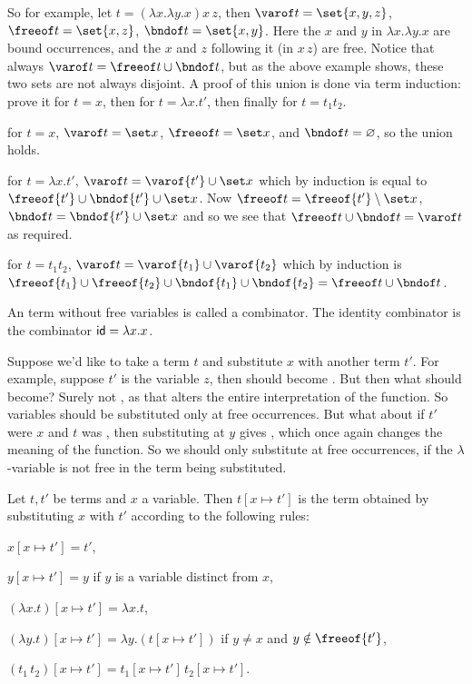 \edefn

So for example, let $t=(\lambda x.\lambda y.x)x\,z$, then $\varof t=\set{x,y,z}$, $\freeof t=\set{x,z}$, $\bndof t=\set{x,y}$.
Here the $x$ and $y$ in $\lambda x.\lambda y.x$ are bound occurrences, and the $x$ and $z$ following it (in $x\,z$) are free.
Notice that always $\varof t=\freeof t\cup\bndof t$, but as the above example shows, these two sets are not always disjoint.
A proof of this union is done via term induction: prove it for $t=x$, then for $t=\lambda x.t'$, then finally for $t=t_1t_2$.
\benum
    \item for $t=x$, $\varof t=\set x$, $\freeof t=\set x$, and $\bndof t=\varnothing$, so the union holds.
    \item for $t=\lambda x.t'$, $\varof t=\varof{t'}\cup\set x$ which by induction is equal to $\freeof{t'}\cup\bndof{t'}\cup\set x$.
        Now $\freeof t=\freeof{t'}\setminus\set x$, $\bndof t=\bndof{t'}\cup\set x$ and so we see that $\freeof t\cup\bndof t=\varof t$ as required.
    \item for $t=t_1t_2$, $\varof t=\varof{t_1}\cup\varof{t_2}$ which by induction is $\freeof{t_1}\cup\freeof{t_2}\cup\bndof{t_1}\cup\bndof{t_2}=\freeof t\cup\bndof t$.
\eenum

\bdefn

    An term without free variables is called a {\emphcolor combinator}.
    The {\emphcolor identity combinator} is the combinator ${\sf id}=\lambda x.x$.

\edefn

Suppose we'd like to take a term $t$ and substitute $x$ with another term $t'$.
For example, suppose $t'$ is the variable $z$, then  should become .
But then what should  become?
Surely not , as that alters the entire interpretation of the function.
So variables should be substituted only at free occurrences.
But what about if $t'$ were $x$ and $t$ was , then substituting at $y$ gives , which once again changes the meaning of the function.
So we should only substitute at free occurrences, if the $\lambda$-variable is not free in the term being substituted.

\bdefn

    Let $t,t'$ be terms and $x$ a variable.
    Then $t[x\mapsto t']$ is the term obtained by substituting $x$ with $t'$ according to the following rules:
    \benum
        \item $x[x\mapsto t']=t'$,
        \item $y[x\mapsto t']=y$ if $y$ is a variable distinct from $x$,
        \item $(\lambda x.t)[x\mapsto t']=\lambda x.t$,
        \item $(\lambda y.t)[x\mapsto t']=\lambda y.(t[x\mapsto t'])$ if $y\neq x$ and $y\notin\freeof{t'}$,
        \item $(t_1\,t_2)[x\mapsto t']=t_1[x\mapsto t']\,t_2[x\mapsto t']$.
    \eenum

